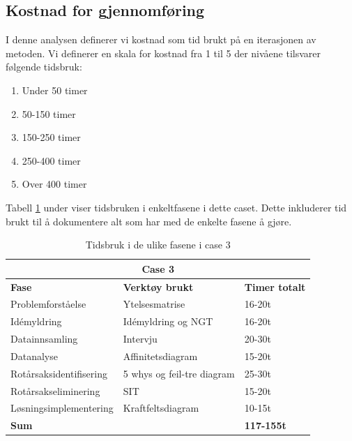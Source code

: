 \subsection{Kostnad for gjennomføring}
I denne analysen definerer vi kostnad som tid brukt på en iterasjonen av metoden. Vi definerer en skala for kostnad fra 1 til 5 der nivåene tilsvarer følgende tidsbruk:

\begin{enumerate}
    \item Under 50 timer
    \item 50-150 timer
    \item 150-250 timer
    \item 250-400 timer
    \item Over 400 timer
\end{enumerate}

Tabell \ref{tab:tidsbruk_case3} under viser tidsbruken i enkeltfasene i dette caset. Dette inkluderer tid brukt til å dokumentere alt som har med de enkelte fasene å gjøre. 

\begin{table}[H]
  \centering
  \caption{Tidsbruk i de ulike fasene i case 3}
    \begin{tabular}{|lr|l|}
    \hline
    \multicolumn{3}{|c|}{\cellcolor{yellow}\textbf{Case 3}} \\
    \hline
    \multicolumn{1}{|l|}{\cellcolor{apricot}\textbf{Fase}} & \multicolumn{1}{l|}{\cellcolor{apricot}\textbf{Verktøy brukt}} & \cellcolor{apricot}\textbf{Timer totalt} \\
    \hline
    \multicolumn{1}{|l|}{Problemforståelse} & \multicolumn{1}{l|}{Ytelsesmatrise} & 16-20t \\
    \hline
    \multicolumn{1}{|l|}{Idémyldring} & \multicolumn{1}{l|}{Idémyldring og NGT} & 16-20t \\
    \hline
    \multicolumn{1}{|l|}{Datainnsamling} & \multicolumn{1}{l|}{Intervju} & 20-30t \\
    \hline
    \multicolumn{1}{|l|}{Datanalyse} & \multicolumn{1}{l|}{Affinitetsdiagram} & 15-20t \\
    \hline
    \multicolumn{1}{|l|}{Rotårsaksidentifisering} & \multicolumn{1}{l|}{5 whys og feil-tre diagram} & 25-30t \\
    \hline
    \multicolumn{1}{|l|}{Rotårsakseliminering} & \multicolumn{1}{l|}{SIT} & 15-20t \\
    \hline
    \multicolumn{1}{|l|}{Løsningsimplementering} & \multicolumn{1}{l|}{Kraftfeltsdiagram} & 10-15t \\
    \hline
    \multicolumn{2}{|l|}{\textbf{Sum}} & \textbf{117-155t} \\
    \hline
    \end{tabular}%
  \label{tab:tidsbruk_case3}%
\end{table}%


